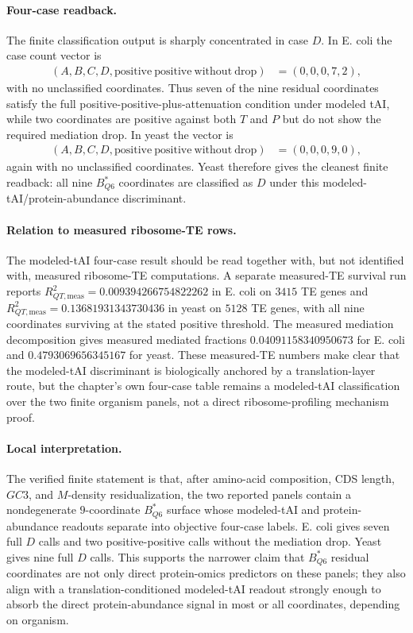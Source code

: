 \paragraph{Four-case readback.}
The finite classification output is sharply concentrated in case $D$.  In E. coli the case count vector is
$$
\begin{aligned}
(A,B,C,D,\mathrm{positive\ positive\ without\ drop}) &= (0,0,0,7,2),
\end{aligned}
$$
with no unclassified coordinates.  Thus seven of the nine residual coordinates satisfy the full positive-positive-plus-attenuation condition under modeled tAI, while two coordinates are positive against both $T$ and $P$ but do not show the required mediation drop.  In yeast the vector is
$$
\begin{aligned}
(A,B,C,D,\mathrm{positive\ positive\ without\ drop}) &= (0,0,0,9,0),
\end{aligned}
$$
again with no unclassified coordinates.  Yeast therefore gives the cleanest finite readback: all nine $B^{*}_{Q6}$ coordinates are classified as $D$ under this modeled-tAI/protein-abundance discriminant.

\paragraph{Relation to measured ribosome-TE rows.}
The modeled-tAI four-case result should be read together with, but not identified with, measured ribosome-TE computations.  A separate measured-TE survival run reports $R^2_{QT,\mathrm{meas}}=0.009394266754822262$ in E. coli on $3415$ TE genes and $R^2_{QT,\mathrm{meas}}=0.13681931343730436$ in yeast on $5128$ TE genes, with all nine coordinates surviving at the stated positive threshold.  The measured mediation decomposition gives measured mediated fractions $0.04091158340950673$ for E. coli and $0.4793069656345167$ for yeast.  These measured-TE numbers make clear that the modeled-tAI discriminant is biologically anchored by a translation-layer route, but the chapter's own four-case table remains a modeled-tAI classification over the two finite organism panels, not a direct ribosome-profiling mechanism proof.

\paragraph{Local interpretation.}
The verified finite statement is that, after amino-acid composition, CDS length, $GC3$, and $M$-density residualization, the two reported panels contain a nondegenerate $9$-coordinate $B^{*}_{Q6}$ surface whose modeled-tAI and protein-abundance readouts separate into objective four-case labels.  E. coli gives seven full $D$ calls and two positive-positive calls without the mediation drop.  Yeast gives nine full $D$ calls.  This supports the narrower claim that $B^{*}_{Q6}$ residual coordinates are not only direct protein-omics predictors on these panels; they also align with a translation-conditioned modeled-tAI readout strongly enough to absorb the direct protein-abundance signal in most or all coordinates, depending on organism.

